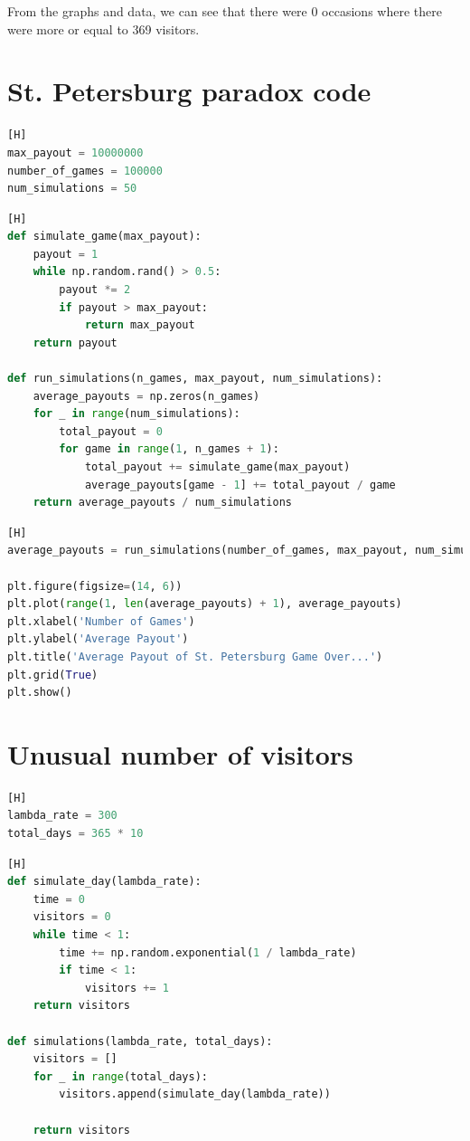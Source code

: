 \documentclass{article}
\begin{document}
From the graphs and data, we can see that there were 0 occasions where there were more or equal to 369 visitors.


\appendix

\section{St. Petersburg paradox code}
\begin{lstlisting}[language=Python][H]
max_payout = 10000000
number_of_games = 100000
num_simulations = 50
\end{lstlisting}

\begin{lstlisting}[language=Python][H]
def simulate_game(max_payout):
    payout = 1
    while np.random.rand() > 0.5:
        payout *= 2
        if payout > max_payout:
            return max_payout
    return payout

def run_simulations(n_games, max_payout, num_simulations):
    average_payouts = np.zeros(n_games)
    for _ in range(num_simulations):
        total_payout = 0
        for game in range(1, n_games + 1):
            total_payout += simulate_game(max_payout)
            average_payouts[game - 1] += total_payout / game
    return average_payouts / num_simulations
\end{lstlisting}

\begin{lstlisting}[language=Python][H]
average_payouts = run_simulations(number_of_games, max_payout, num_simulations)

plt.figure(figsize=(14, 6))
plt.plot(range(1, len(average_payouts) + 1), average_payouts)
plt.xlabel('Number of Games')
plt.ylabel('Average Payout')
plt.title('Average Payout of St. Petersburg Game Over...')
plt.grid(True)
plt.show()
\end{lstlisting}



\section{Unusual number of visitors}

\begin{lstlisting}[language=Python][H]
lambda_rate = 300
total_days = 365 * 10
\end{lstlisting}

\begin{lstlisting}[language=Python][H]
def simulate_day(lambda_rate):
    time = 0
    visitors = 0
    while time < 1:
        time += np.random.exponential(1 / lambda_rate)
        if time < 1:
            visitors += 1
    return visitors

def simulations(lambda_rate, total_days):
    visitors = []
    for _ in range(total_days):
        visitors.append(simulate_day(lambda_rate))
    
    return visitors
\end{lstlisting}
\end{document}
